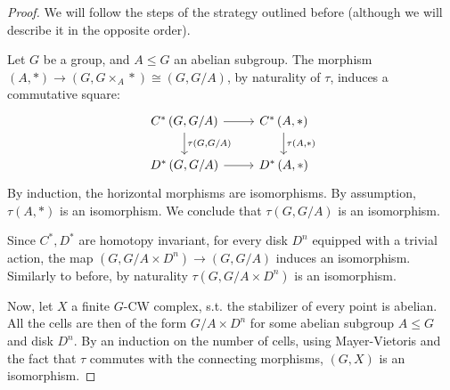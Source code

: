 \begin{proof}
	We will follow the steps of the strategy outlined before (although we will describe it in the opposite order).
	
	Let $G$ be a group, and $A \leq G$ an abelian subgroup.
	The morphism $\left(A, *\right) \to \left(G, G \times_A *\right) \cong \left(G, G/A\right)$, by naturality of $\tau$, induces a commutative square:
	$$
	\begin{tikzcd}
		C^*\left(G, G/A\right) \arrow{r}{} \arrow{d}{\tau\left(G, G/A\right)} & C^*\left(A, *\right) \arrow{d}{\tau\left(A, *\right)} \\
		D^*\left(G, G/A\right) \arrow{r}{} & D^*\left(A, *\right)
	\end{tikzcd}
	$$
	By induction, the horizontal morphisms are isomorphisms.
	By assumption, $\tau\left(A, *\right)$ is an isomorphism.
	We conclude that $\tau\left(G, G/A\right)$ is an isomorphism.
	
	Since $C^*, D^*$ are homotopy invariant, for every disk $D^n$ equipped with a trivial action, the map $\left(G, G/A \times D^n\right) \to \left(G, G/A\right)$ induces an isomorphism.
	Similarly to before, by naturality $\tau\left(G, G/A \times D^n\right)$ is an isomorphism.
	
	Now, let $X$ a finite $G$-CW complex, s.t. the stabilizer of every point is abelian.
	All the cells are then of the form $G/A \times D^n$ for some abelian subgroup $A \leq G$ and disk $D^n$.
	By an induction on the number of cells, using Mayer-Vietoris and the fact that $\tau$ commutes with the connecting morphisms, $\left(G, X\right)$ is an isomorphism.
	

\end{proof}
